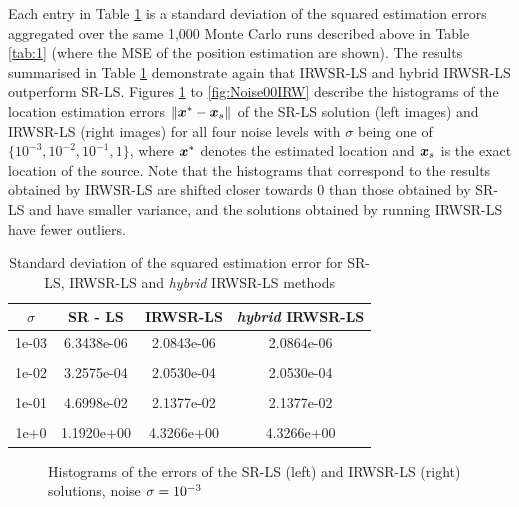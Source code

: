 Each entry in Table \ref{tab:2} is a standard deviation of the squared  estimation errors  aggregated over the  same 1,000 Monte Carlo runs described above in Table \ref{tab:1} (where the MSE of the position estimation are shown). The results summarised in Table \ref{tab:2} demonstrate again that IRWSR-LS and hybrid IRWSR-LS outperform SR-LS. Figures \ref{fig:Noise03IRW} to \ref{fig:Noise00IRW} describe the histograms of the location estimation errors $\|\mbox{\boldmath$x$}^* - \mbox{\boldmath$x$}_s\|$ of the SR-LS solution (left images) and IRWSR-LS (right images) for all four noise levels with $\sigma$ being one of $\{10^{-3}, 10^{-2}, 10^{-1}, 1\}$, where $\mbox{\boldmath$x$}^*$ denotes the estimated location and $\mbox{\boldmath$x$}_s$ is the exact location of the source. Note that the histograms that correspond to the results obtained by IRWSR-LS are shifted closer towards $0$ than those obtained by SR-LS and have smaller variance, and the solutions obtained by running IRWSR-LS have fewer outliers.


\begin{table}[h]
\centering
\caption{Standard deviation of the squared estimation error for SR-LS, IRWSR-LS and \textit{hybrid} IRWSR-LS methods}
\begin{tabular}{|c|c|c|c|} \hline
$\sigma$ & SR - LS & IRWSR-LS & \textit{hybrid} IRWSR-LS \\ \hline
1e-03&	6.3438e-06&	2.0843e-06 & 2.0864e-06\\ &&&\\
1e-02&	3.2575e-04&	2.0530e-04 & 2.0530e-04\\ &&&\\
1e-01&	4.6998e-02&	2.1377e-02 & 2.1377e-02\\ &&&\\
1e+0&	1.1920e+00&	4.3266e+00 & 4.3266e+00\\ %
\hline
\end{tabular}
\label{tab:2}
\end{table}



\begin{figure}%
\centering
\caption{Histograms of the errors of the SR-LS (left) and IRWSR-LS (right) solutions, noise $\protect\sigma = 10^{-3}$}
\label{fig:Noise03IRW}
\end{figure}

